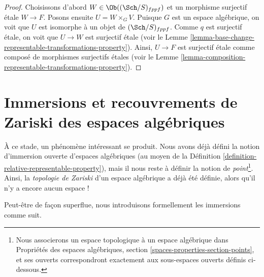 \begin{proof}
Choisissons d'abord $W \in \Ob((\Sch/S)_{fppf})$
et un morphisme surjectif \'etale $W \to F$.
Posons ensuite $U = W \times_G V$. Puisque $G$ est un espace algébrique,
on voit que $U$ est isomorphe à un objet de $(\Sch/S)_{fppf}$.
Comme $q$ est surjectif \'etale, on voit que $U \to W$ est surjectif
\'etale (voir le
Lemme \ref{lemma-base-change-representable-transformations-property}).
Ainsi, $U \to F$ est surjectif \'etale comme composé de morphismes surjectifs
\'etales (voir le
Lemme \ref{lemma-composition-representable-transformations-property}).
\end{proof}



























\section{Immersions et recouvrements de Zariski des espaces algébriques}
\label{section-Zariski}

\noindent
À ce stade, un phénomène intéressant se produit. Nous avons déjà défini
la notion d'immersion ouverte d'espaces algébriques (au moyen de la
Définition \ref{definition-relative-representable-property}),
mais il nous reste à définir la notion de {\it point}\footnote{Nous
associerons un espace topologique à un espace algébrique dans
Propriétés des espaces algébriques, section
\ref{spaces-properties-section-points},
et ses ouverts correspondront exactement aux sous-espaces ouverts définis ci-dessous.}.
Ainsi, la {\it topologie de Zariski} d'un espace algébrique
a déjà été définie, alors qu'il n'y a encore aucun espace !

\medskip\noindent
Peut-être de façon superflue, nous introduisons formellement les immersions comme suit.

